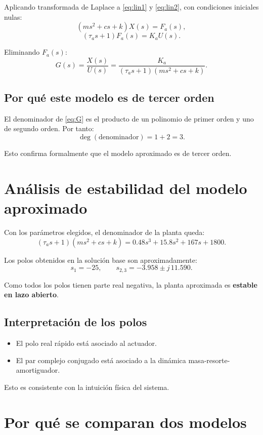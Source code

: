 \documentclass[11pt]{article}
\begin{document}
Aplicando transformada de Laplace a \eqref{eq:lin1} y \eqref{eq:lin2}, con condiciones iniciales nulas:
\[
(ms^2 + cs + k)X(s) = F_a(s),
\]
\[
(\tau_a s + 1)F_a(s) = K_aU(s).
\]

Eliminando $F_a(s)$:
\begin{equation}
G(s)=\frac{X(s)}{U(s)}
=
\frac{K_a}{(\tau_a s + 1)(ms^2 + cs + k)}.
\label{eq:G}
\end{equation}

\subsection{Por qu\'e este modelo es de tercer orden}

El denominador de \eqref{eq:G} es el producto de un polinomio de primer orden y uno de segundo orden. Por tanto:
\[
\deg(\text{denominador}) = 1 + 2 = 3.
\]

Esto confirma formalmente que el modelo aproximado es de tercer orden.

\section{An\'alisis de estabilidad del modelo aproximado}

Con los par\'ametros elegidos, el denominador de la planta queda:
\[
(\tau_as+1)(ms^2+cs+k)

= 0.48s^3 + 15.8s^2 + 167s + 1800.
\]

Los polos obtenidos en la soluci\'on base son aproximadamente:
\[
s_1 = -25,\qquad
s_{2,3} = -3.958 \pm j\,11.590.
\]

Como todos los polos tienen parte real negativa, la planta aproximada es \textbf{estable en lazo abierto}.

\subsection{Interpretaci\'on de los polos}

\begin{itemize}[leftmargin=1.2cm]
\item El polo real r\'apido est\'a asociado al actuador.
\item El par complejo conjugado est\'a asociado a la din\'amica masa-resorte-amortiguador.
\end{itemize}

Esto es consistente con la intuici\'on f\'isica del sistema.

\section{Por qu\'e se comparan dos modelos}
\end{document}
